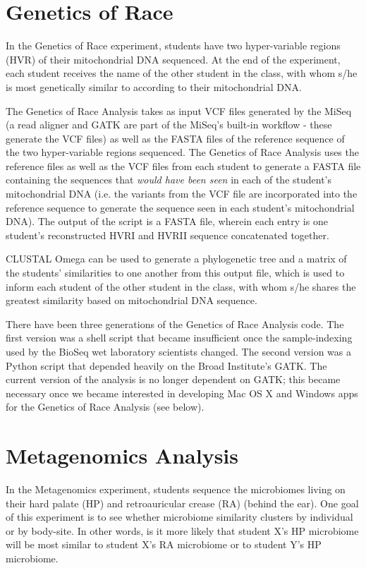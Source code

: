 \documentclass{report}
\begin{document}
\section{Genetics of Race}

In the Genetics of Race experiment, students have two hyper-variable regions (HVR) of their mitochondrial DNA sequenced. At the end of the experiment, each student receives the name of the other student in the class, with whom s/he is most genetically similar to according to their mitochondrial DNA. 

The Genetics of Race Analysis takes as input VCF files generated by the MiSeq (a read aligner and GATK are part of the MiSeq's built-in workflow - these generate the VCF files) as well as the FASTA files of the reference sequence of the two hyper-variable regions sequenced. The Genetics of Race Analysis uses the reference files as well as the VCF files from each student to generate a FASTA file containing the sequences that \emph{would have been seen} in each of the student's mitochondrial DNA (i.e. the variants from the VCF file are incorporated into the reference sequence to generate the sequence seen in each student's mitochondrial DNA). The output of the script is a FASTA file, wherein each entry is one student's reconstructed HVRI and HVRII sequence concatenated together.

CLUSTAL Omega can be used to generate a phylogenetic tree and a matrix of the students' similarities to one another from this output file, which is used to inform each student of the other student in the class, with whom s/he shares the greatest similarity based on mitochondrial DNA sequence.

There have been three generations of the Genetics of Race Analysis code. The first version was a shell script that became insufficient once the sample-indexing used by the BioSeq wet laboratory scientists changed. The second version was a Python script that depended heavily on the Broad Institute's GATK. The current version of the analysis is no longer dependent on GATK; this became necessary once we became interested in developing Mac OS X and Windows apps for the Genetics of Race Analysis (see below).

\section{Metagenomics Analysis}

\noindent In the Metagenomics experiment, students sequence the microbiomes living on their hard palate (HP) and retroauricular crease (RA) (behind the ear). One goal of this experiment is to see whether microbiome similarity clusters by individual or by body-site. In other words, is it more likely that student X's HP microbiome will be most similar to student X's RA microbiome or to student Y's HP microbiome.
\end{document}
